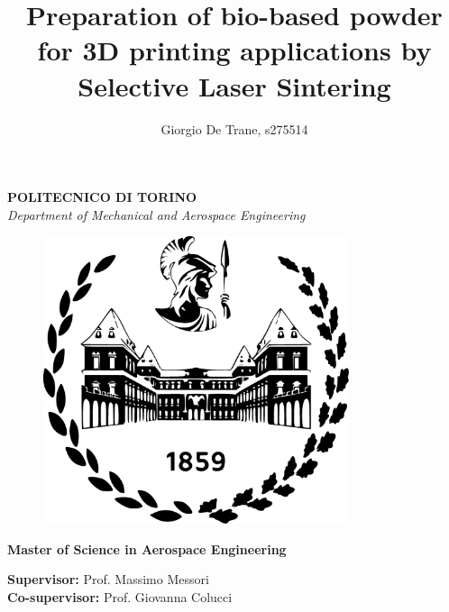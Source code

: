 \documentclass{article}
\author{Giorgio De Trane, s275514}
\title{\textbf{Preparation of bio-based powder for 3D printing applications by Selective Laser Sintering}}
\begin{document}
    \setlength{\parindent}{0pt}

    \maketitle
    \begin{center}
        \textbf{POLITECNICO DI TORINO} \\ 
        \textit{Department of Mechanical and Aerospace Engineering} \\
    \end{center}

    \begin{figure}[h!]
        \centering
        \includegraphics[width=0.8\textwidth]{Pictures/polito_logo.eps}  
        \label{fig:polito_logo}      
    \end{figure}

    \begin{center} 
        \textbf{Master of Science in Aerospace Engineering} \\
    \end{center}


    \begin{center}
        \textbf{Supervisor:} Prof. Massimo Messori \\
        \textbf{Co-supervisor:} Prof. Giovanna Colucci \\
    \end{center}


\end{document}
